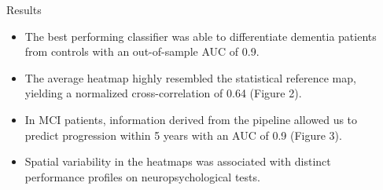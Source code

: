 \documentclass[final,11pt]{beamer}
\begin{document}
\begin{frame}[t]
\begin{columns}[t]
\begin{column}{.3\textwidth}
            \end{column}
            \begin{column}{.3\textwidth}
                \begin{block}{Results}
                    \parbox{\textwidth}{\justify
                        \begin{itemize}[leftmargin=0em,labelindent=\parindent]
                            \item[\textbullet] The best performing classifier was able to differentiate dementia patients from controls with an out-of-sample AUC of 0.9.
                            \item[\textbullet] The average heatmap highly resembled the statistical reference map, yielding a normalized cross-correlation of 0.64 (Figure 2).
                            \item[\textbullet] In MCI patients, information derived from the pipeline allowed us to predict progression within 5 years with an AUC of 0.9 (Figure 3).
                            \item[\textbullet] Spatial variability in the heatmaps was associated with distinct performance profiles on neuropsychological tests.
                        \end{itemize}
                        \vspace{0.6cm}
                        
                    }
                \end{block}
            \end{column}
        \end{columns}


\end{frame}
\end{document}
